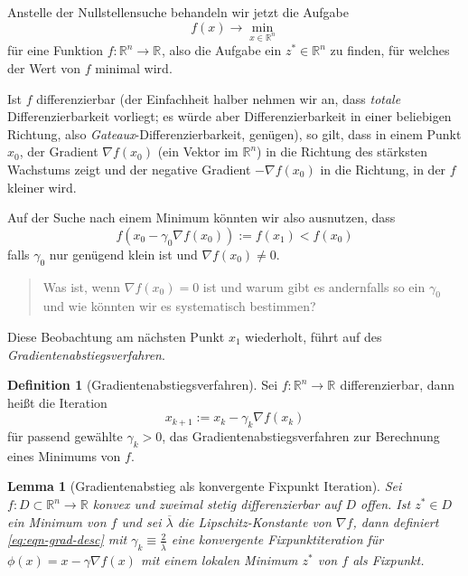 \documentclass[
]{book}
\newenvironment {JHSAYS} [0] {\begin{quote}\color{jhsc}} {\end{quote}}
\newtheorem{lemma}{Lemma}[chapter]
\theoremstyle{definition}
\newtheorem{definition}{Definition}[chapter]
\theoremstyle{definition}
\theoremstyle{definition}
\theoremstyle{definition}
\theoremstyle{remark}
\begin{document}
Anstelle der Nullstellensuche behandeln wir jetzt die Aufgabe
\begin{equation*}
f(x) \to \min_{x\in \mathbb R^{n}}
\end{equation*}
für eine Funktion \(f \colon \mathbb R^{n} \to \mathbb R^{}\), also die Aufgabe ein \(z^*\in \mathbb R^{n}\) zu finden, für welches der Wert von \(f\) minimal wird.

Ist \(f\) differenzierbar (der Einfachheit halber nehmen wir an, dass \emph{totale} Differenzierbarkeit vorliegt; es würde aber Differenzierbarkeit in einer beliebigen Richtung, also \emph{Gateaux}-Differenzierbarkeit, genügen), so gilt, dass in einem Punkt \(x_0\), der Gradient \(\nabla f(x_0)\) (ein Vektor im \(\mathbb R^{n}\)) in die Richtung des stärksten Wachstums zeigt und der negative Gradient \(-\nabla f(x_0)\) in die Richtung, in der \(f\) kleiner wird.

Auf der Suche nach einem Minimum könnten wir also ausnutzen, dass
\begin{equation*}
f(x_0 - \gamma_0 \nabla f(x_0)):=f(x_1)   < f(x_0)
\end{equation*}
falls \(\gamma_0\) nur genügend klein ist und \(\nabla f(x_0) \neq 0\).

\leavevmode\hypertarget{rem-gamma-zerograd}{}%
\begin{JHSAYS}
Was ist, wenn \(\nabla f(x_0) = 0\) ist und warum gibt es andernfalls so ein \(\gamma_0\) und wie könnten wir es systematisch bestimmen?

\end{JHSAYS}

Diese Beobachtung am nächsten Punkt \(x_1\) wiederholt, führt auf des \emph{Gradientenabstiegsverfahren}.

\begin{definition}[Gradientenabstiegsverfahren]
\protect\hypertarget{def:def-grad-descent}{}\label{def:def-grad-descent}Sei \(f\colon \mathbb R^{n} \to \mathbb R^{}\) differenzierbar, dann heißt die Iteration
\begin{equation}
x_{k+1} := x_k - \gamma_k\nabla f(x_k)
\label{eq:eqn-grad-desc}
\end{equation}
für passend gewählte \(\gamma_k>0\), das
Gradientenabstiegsverfahren zur Berechnung eines Minimums von \(f\).
\end{definition}

\begin{lemma}[Gradientenabstieg als konvergente Fixpunkt Iteration]
\protect\hypertarget{lem:lem-graddesc-as-fp}{}\label{lem:lem-graddesc-as-fp}Sei \(f\colon D\subset \mathbb R^{n}\to \mathbb R\) konvex und zweimal stetig differenzierbar auf \(D\) offen. Ist \(z^*\in D\) ein Minimum von \(f\) und sei \(\overline \lambda\) die \emph{Lipschitz-Konstante} von \(\nabla f\), dann definiert \eqref{eq:eqn-grad-desc} mit \(\gamma_k \equiv \frac 2{\overline \lambda}\) eine konvergente Fixpunktiteration für \(\phi(x) = x-\gamma \nabla f(x)\) mit einem lokalen Minimum \(z^*\) von \(f\) als Fixpunkt.
\end{lemma}
\end{document}
